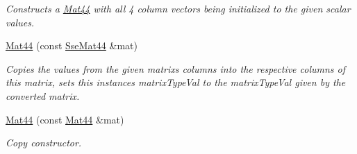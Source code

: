 \begin{DoxyCompactItemize}
\begin{DoxyCompactList}\small\item\em Constructs a \hyperlink{structgfxmath_1_1_mat44}{Mat44} with all 4 column vectors being initialized to the given scalar values. \end{DoxyCompactList}\item 
\hyperlink{structgfxmath_1_1_mat44_a8fafc4c0ac33fb5a3589c43466d1b0c7}{Mat44} (const \hyperlink{structgfxmath_1_1_sse_mat44}{Sse\+Mat44} \&mat)
\begin{DoxyCompactList}\small\item\em Copies the values from the given matrix\textquotesingle{}s columns into the respective columns of this matrix, sets this instance\textquotesingle{}s matrix\+Type\+Val to the matrix\+Type\+Val given by the converted matrix. \end{DoxyCompactList}\item 
\hyperlink{structgfxmath_1_1_mat44_abcebf9e54a3a7954d4f870d1e076517a}{Mat44} (const \hyperlink{structgfxmath_1_1_mat44}{Mat44} \&mat)
\begin{DoxyCompactList}\small\item\em Copy constructor. \end{DoxyCompactList}\end{DoxyCompactItemize}
